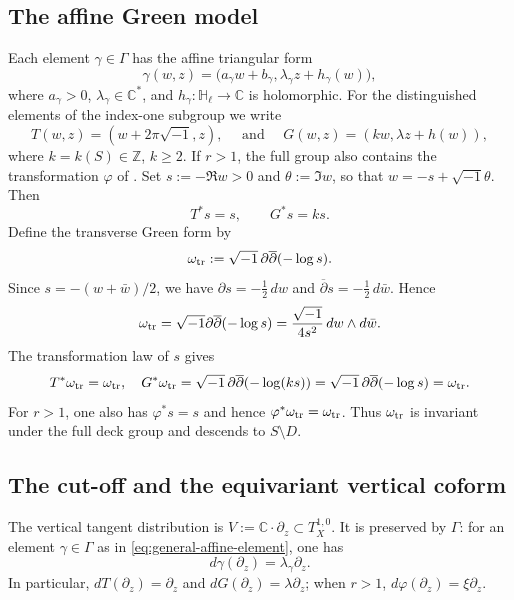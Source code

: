 \documentclass[12pt]{amsart}
\numberwithin{equation}{section}
\newcommand{\ddbar}{\sqrt{-1}\,\partial\overline\partial}
\theoremstyle{remark}
\theoremstyle{definition}
\begin{document}
\subsection{The affine Green model}
Each element $\gamma\in\Gamma$ has the affine triangular form
\begin{equation}\label{eq:general-affine-element}
 \gamma(w,z)=\bigl(a_\gamma w+b_\gamma,\lambda_\gamma z+h_\gamma(w)\bigr),
\end{equation}
where $a_\gamma>0$, $\lambda_\gamma\in\mathbb{C}^*$, and $h_\gamma \colon \mathbb H_\ell \to \mathbb C$ is holomorphic.
For the distinguished elements of the index-one subgroup we write
$$ T(w,z)=(w+2\pi\sqrt{-1},z),
\quad \text{ and } \quad
G(w,z)=(kw,\lambda z+h(w)), $$
where $k=k(S)\in\mathbb Z$, $k\geq2$. If $r>1$, the full group also contains the transformation $\varphi$ of .
Set $s:=-\Re w>0$ and $\theta:=\Im w$, so that $w=-s+\sqrt{-1}\theta$.
Then
\begin{equation}\label{eq:s-transforms}
 T^*s=s,
 \qquad
 G^*s=ks.
\end{equation}
Define the transverse Green form by
\begin{equation*}
 \omega_{\rm tr}:=\ddbar(-\log s).
\end{equation*}
Since $s=-(w+\bar w)/2$, we have $\partial s=-\tfrac12\,dw$ and $\overline\partial s=-\tfrac12\,d\bar w$. Hence
$$ \omega_{\rm tr} = \sqrt{-1} \partial\overline\partial (-\log s) =
 \frac{\sqrt{-1}}{4s^2}\,dw\wedge d\bar w. $$
The transformation law of $s$ gives
\begin{equation*}
 T^*\omega_{\rm tr}=\omega_{\rm tr},
 \quad
 G^*\omega_{\rm tr}
 =
 \ddbar(-\log(ks))
 =
 \ddbar(-\log s)
 =
 \omega_{\rm tr}.
\end{equation*}
For $r>1$, one also has $\varphi^*s=s$ and hence $\varphi^*\omega_{\rm tr}=\omega_{\rm tr}$. Thus $\omega_{\rm tr}$ is invariant under the full deck group and descends to $S\setminus D$.


\subsection{The cut-off and the equivariant vertical coform}
The vertical tangent distribution is $V:=\mathbb{C}\cdot\partial_z\subset T_X^{1,0}$.
It is preserved by $\Gamma$: for an element
$\gamma\in\Gamma$ as in \eqref{eq:general-affine-element}, one has
\begin{equation*}
 d\gamma(\partial_z)=\lambda_\gamma\partial_z.
\end{equation*}
In particular, $dT(\partial_z)=\partial_z$ and $dG(\partial_z)=\lambda\partial_z$; when $r>1$, $d\varphi(\partial_z)=\xi\partial_z$.
\end{document}
